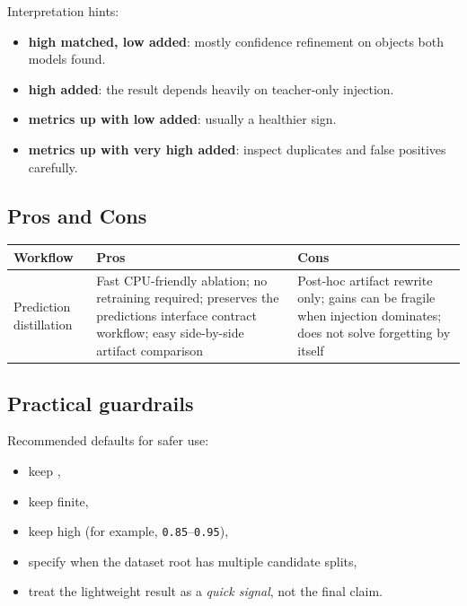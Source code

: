 Interpretation hints:
\begin{itemize}
  \item \textbf{high matched, low added}: mostly confidence refinement on objects both models found.
  \item \textbf{high added}: the result depends heavily on teacher-only injection.
  \item \textbf{metrics up with low added}: usually a healthier sign.
  \item \textbf{metrics up with very high added}: inspect duplicates and false positives carefully.
\end{itemize}

\subsection{Pros and Cons}
\begin{longtable}{@{}p{}p{}p{}@{}}
\toprule
\textbf{Workflow} & \textbf{Pros} & \textbf{Cons} \\
\midrule
Prediction distillation & Fast CPU-friendly ablation; no retraining required; preserves the predictions interface contract workflow; easy side-by-side artifact comparison & Post-hoc artifact rewrite only; gains can be fragile when injection dominates; does not solve forgetting by itself \\
\bottomrule
\end{longtable}

\subsection{Practical guardrails}
Recommended defaults for safer use:
\begin{itemize}
  \item keep ,
  \item keep  finite,
  \item keep  high (for example, \texttt{0.85}--\texttt{0.95}),
  \item specify  when the dataset root has multiple candidate splits,
  \item treat the lightweight  result as a \emph{quick signal}, not the final claim.
\end{itemize}

